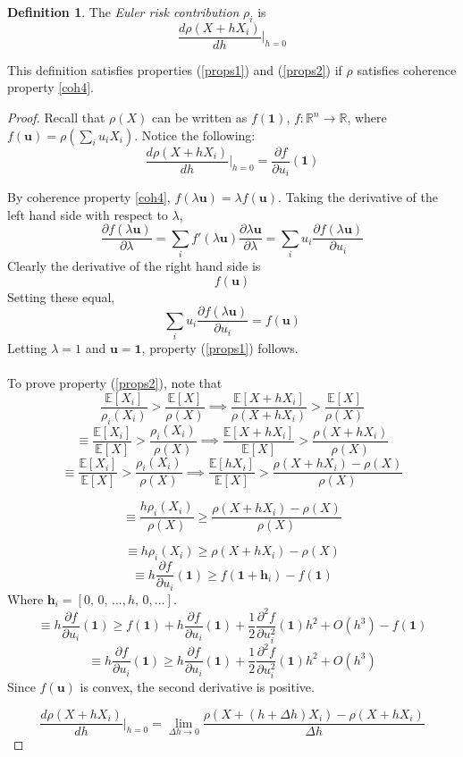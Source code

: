 \documentclass[12pt]{article}
\theoremstyle{definition}
\newtheorem{riskmeasure}{Definition}
\begin{document}
\begin{riskmeasure}
The \emph{Euler risk contribution} \(\rho_i\) is \[\frac{d\rho(X+hX_i)}{dh}\bigg|_{h=0}\]
\end{riskmeasure}

This definition satisfies properties (\ref{props1}) and (\ref{props2}) if \(\rho\) satisfies coherence property \ref{coh4}.

\begin{proof}
Recall that \(\rho(X)\) can be written as \(f(\mathbf{1}),\, f:\mathbb{R}^n \to \mathbb{R}\), where \(f(\mathbf{u})=\rho\left(\sum_i u_i X_i\right)\).  Notice the following:
\[\frac{d\rho(X+hX_i)}{dh}\bigg|_{h=0}=\frac{\partial f} {\partial u_i}\left(\mathbf{1}\right)\]

By coherence property \ref{coh4}, \(f\left(\lambda \mathbf{u}\right)=\lambda f\left(\mathbf{u}\right)\). Taking the derivative of the left hand side with respect to \(\lambda\), 
\[\frac{\partial f(\lambda \mathbf{u})}{\partial \lambda}=\sum_i f'(\lambda \mathbf{u})\frac{\partial \lambda \mathbf{u}}{\partial \lambda}=
\sum_i u_i \frac{\partial f\left(\lambda \mathbf{u}\right)} {\partial u_i}\]
Clearly the derivative of the right hand side is
\[f(\mathbf{u})\]
Setting these equal, 
\[\sum_i u_i \frac{\partial f\left(\lambda \mathbf{u}\right)} {\partial u_i}=f(\mathbf{u})\]
Letting \(\lambda=1\) and \(\mathbf{u}=\mathbf{1}\), property (\ref{props1}) follows.
\\
\\
To prove property (\ref{props2}), note that 
\[\frac{\mathbb{E}[X_i]}{\rho_i(X_i)} >\frac{\mathbb{E}[X]}{\rho(X)} \implies \frac{\mathbb{E}[X+hX_i]}{\rho(X+hX_i)}>\frac{\mathbb{E}[X]}{\rho(X)}\]
\[\equiv \frac{\mathbb{E}[X_i]}{\mathbb{E}[X]} >\frac{\rho_i(X_i)}{\rho(X)} \implies \frac{\mathbb{E}[X+hX_i]}{\mathbb{E}[X]}>\frac{\rho(X+hX_i)}{\rho(X)}\]
\[\equiv \frac{\mathbb{E}[X_i]}{\mathbb{E}[X]} >\frac{\rho_i(X_i)}{\rho(X)} \implies \frac{\mathbb{E}[hX_i]}{\mathbb{E}[X]}>\frac{\rho(X+hX_i)-\rho(X)}{\rho(X)}\]


\[\equiv \frac{h \rho_i(X_i)}{\rho(X)} \geq\frac{\rho(X+hX_i)-\rho(X)}{\rho(X)}\]

\[\equiv h\rho_i(X_i) \geq \rho(X+hX_i)-\rho(X)\]
\[\equiv h \frac{\partial f }{\partial u_i}(\mathbf{1}) \geq f(\mathbf{1}+\mathbf{h}_i)-f(\mathbf{1})\]
Where \(\mathbf{h}_i=[0,\,0,\,...,h,\,0,...]\).
\[\equiv h \frac{\partial f }{\partial u_i}(\mathbf{1}) \geq f(\mathbf{1})+h \frac{\partial f }{\partial u_i}(\mathbf{1})+\frac{1}{2}\frac{\partial^2 f }{\partial u_i ^2} (\mathbf{1}) h^2+O(h^3) -f(\mathbf{1})\]
\[\equiv h \frac{\partial f }{\partial u_i}(\mathbf{1}) \geq h \frac{\partial f }{\partial u_i}(\mathbf{1})+\frac{1}{2}\frac{\partial^2 f }{\partial u_i ^2} (\mathbf{1}) h^2+O(h^3) \]
Since \(f(\mathbf{u})\) is convex, the second derivative is positive.

\[\frac{d\rho(X+hX_i)}{dh}\bigg|_{h=0}=\lim_{\Delta h \to 0}\frac{\rho(X+(h+\Delta h)X_i)-\rho(X+hX_i)}{\Delta h} \]

\end{proof}
\end{document}
